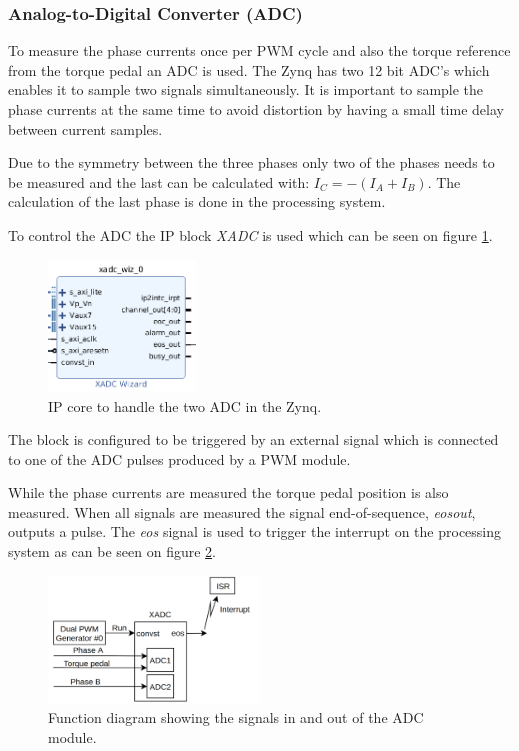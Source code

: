 \subsubsection{Analog-to-Digital Converter (ADC)}

To measure the phase currents once per PWM cycle and also the torque reference from the torque pedal an ADC is used. The Zynq has two 12 bit ADC's which enables it to sample two signals simultaneously. It is important to sample the phase currents at the same time to avoid distortion by having a small time delay between current samples. 

Due to the symmetry between the three phases only two of the phases needs to be measured and the last can be calculated with: $I_C = -(I_A + I_B)$.
The calculation of the last phase is done in the processing system.

To control the ADC the IP block \textit{XADC} is used which can be seen on figure \ref{fig:adc_module}. 

\begin{figure}[H]
    \vspace{-0.5cm}
	\centering
	\includegraphics[width=0.35\textwidth]{pictures/software/adc.png}
	\caption{IP core to handle the two ADC in the Zynq.}
	\label{fig:adc_module}
\end{figure}

The block is configured to be triggered by an external signal which is connected to one of the ADC pulses produced by a PWM module.

While the phase currents are measured the torque pedal position is also measured. When all signals are measured the signal end-of-sequence, \textit{eos\textunderscore out}, outputs a pulse. The \textit{eos} signal is used to trigger the interrupt on the processing system as can be seen on figure \ref{fig:adc_block_diagram}.

\begin{figure}[H]
    \vspace{-0.5cm}
	\centering
	\includegraphics[width=0.5\textwidth]{pictures/software/adc_block_diagram.png}
	\caption{Function diagram showing the signals in and out of the ADC module.}
	\label{fig:adc_block_diagram}
\end{figure}



